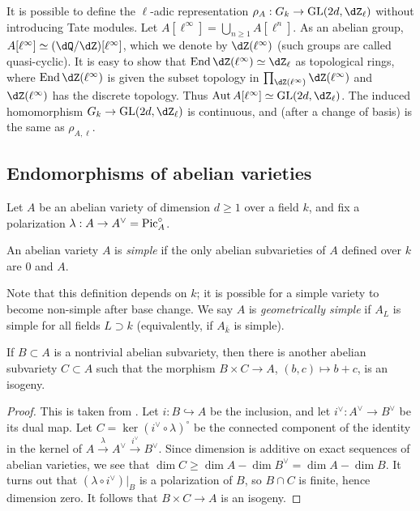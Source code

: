 It is possible to define the $\ell$-adic representation 
$\rho_A:G_k\to \gl{2d}{\dZ_\ell}$ without introducing Tate 
modules. Let $A[\ell^\infty] = \bigcup_{n\geqslant 1} A[\ell^n]$. As an 
abelian group, $A[\ell^\infty]\simeq (\dQ/\dZ)[\ell^\infty]$, which we denote 
by $\dZ(\ell^\infty)$ (such groups are called quasi-cyclic). It is easy to 
show that $\End \dZ(\ell^\infty)\simeq \dZ_\ell$ as topological 
rings, where $\End \dZ(\ell^\infty)$ is given the subset topology in 
$\prod_{\dZ(\ell^\infty)} \dZ(\ell^\infty)$ and $\dZ(\ell^\infty)$ has the 
discrete topology. Thus 
$\aut A[\ell^\infty]\simeq \gl{2 d}{\dZ_\ell}$. The induced 
homomorphism $G_k \to \gl{2 d}{\dZ_\ell}$ is continuous, and 
(after a change of basis) is the same as $\rho_{A,\ell}$. 





\subsection{Endomorphisms of abelian varieties}

Let $A$ be an abelian variety of dimension $d\geqslant 1$ over a field $k$, 
and fix a polarization $\lambda:A\to A^\vee=\operatorname{Pic}_A^\circ$. 

\begin{definition}
An abelian variety $A$ is \emph{simple} if the only abelian subvarieties of $A$ 
defined over $k$ are $0$ and $A$.
\end{definition}

Note that this definition depends on $k$; it is possible for a simple variety 
to become non-simple after base change. We say $A$ is \emph{geometrically 
simple} if $A_L$ is simple for all fields $L\supset k$ (equivalently, if 
$A_{\bar k}$ is simple). 

\begin{theorem}[Poincar\'e]\label{thm:poincare-reducibility}
If $B\subset A$ is a nontrivial abelian subvariety, then there is another 
abelian subvariety $C\subset A$ such that the morphism $B\times C\to A$, 
$(b,c)\mapsto b+c$, is an isogeny. 
\end{theorem}
\begin{proof}
This is taken from \cite[I.10.1]{mi-av}. Let $i:B\hookrightarrow A$ be the 
inclusion, and let $i^\vee:A^\vee \to B^\vee$ be its dual map. Let 
$C=\ker(i^\vee\circ\lambda)^\circ$ be the connected component of the identity 
in the kernel of $A\xrightarrow\lambda A^\vee \xrightarrow{i^\vee} B^\vee$. 
Since dimension is additive on exact sequences of abelian varieties, we see 
that $\dim C\geqslant \dim A-\dim B^\vee=\dim A-\dim B$. It turns out that 
$(\lambda\circ i^\vee)|_B$ is a polarization of $B$, so $B\cap C$ is finite, 
hence dimension zero. It follows that $B\times C\to A$ is an isogeny. 
\end{proof}

